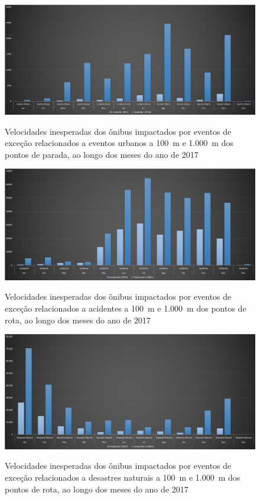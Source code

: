 \documentclass[
	12pt,				%
	oneside,			%
	a4paper,			%
	english,			%
	brazil				%
	]{abntex2ppgsi}
\begin{document}
{{{\begin{figure}[!htb]
	\centering
 	  \caption{Velocidades inesperadas dos ônibus impactados por eventos de exceção relacionados a eventos urbanos a 100~m e 1.000~m dos pontos de parada, ao longo dos meses do ano de 2017}
		\includegraphics[width=1\linewidth]{images/apriori_analysis_stops_urban_events.png}
	\label{fig:apriori_analysis_stops_urban_events}
\end{figure}

\begin{figure}[!htb]
	\centering
 	  \caption{Velocidades inesperadas dos ônibus impactados por eventos de exceção relacionados a acidentes a 100~m e 1.000~m dos pontos de rota, ao longo dos meses do ano de 2017}
		\includegraphics[width=1\linewidth]{images/apriori_analysis_shapes_accidents.png}
	\label{fig:apriori_analysis_shapes_accidents}
\end{figure}

\begin{figure}[!htb]
	\centering
 	  \caption{Velocidades inesperadas dos ônibus impactados por eventos de exceção relacionados a desastres naturais a 100~m e 1.000~m dos pontos de rota, ao longo dos meses do ano de 2017}
		\includegraphics[width=1\linewidth]{images/apriori_analysis_shapes_natural_disasters.png}
	\label{fig:apriori_analysis_shapes_natural_disasters}
\end{figure}

}}}
\end{document}
